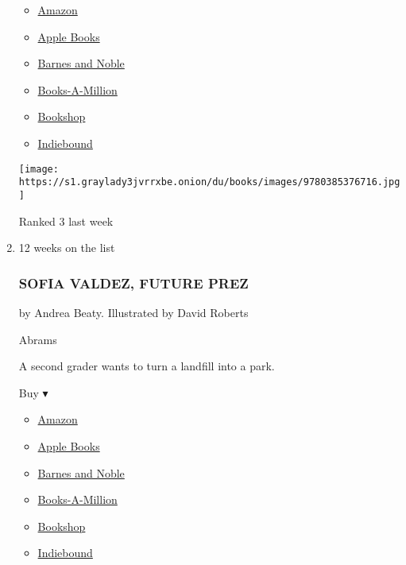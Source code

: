 \begin{enumerate}
  \begin{itemize}
  \tightlist
  \item
    \href{http://www.amazon.com/The-Wonderful-Things-You-Will/dp/0385376715?tag=NYTBS-20}{Amazon}
  \item
    \href{https://du-gae-books-dot-nyt-du-prd.appspot.com/buy?title=THE+WONDERFUL+THINGS+YOU+WILL+BE\&author=Emily+Winfield+Martin}{Apple
    Books}
  \item
    \href{https://www.anrdoezrs.net/click-7990613-11819508?url=https\%3A\%2F\%2Fwww.barnesandnoble.com\%2Fw\%2F\%3Fean\%3D9780385376716}{Barnes
    and Noble}
  \item
    \href{https://www.anrdoezrs.net/click-7990613-35140?url=https\%3A\%2F\%2Fwww.booksamillion.com\%2Fp\%2FTHE\%2BWONDERFUL\%2BTHINGS\%2BYOU\%2BWILL\%2BBE\%2FEmily\%2BWinfield\%2BMartin\%2F9780385376716}{Books-A-Million}
  \item
    \href{https://bookshop.org/a/3546/9780385376716}{Bookshop}
  \item
    \href{https://www.indiebound.org/book/9780385376716?aff=NYT}{Indiebound}
  \end{itemize}

  \texttt{[image: https://s1.graylady3jvrrxbe.onion/du/books/images/9780385376716.jpg]}

  Ranked 3 last week
\item
  12 weeks on the list

  \hypertarget{sofia-valdez-future-prez}{%
  \subsubsection{SOFIA VALDEZ, FUTURE
  PREZ}\label{sofia-valdez-future-prez}}

  by Andrea Beaty. Illustrated by David Roberts

  Abrams

  A second grader wants to turn a landfill into a park.

  Buy ▾

  \begin{itemize}
  \tightlist
  \item
    \href{https://www.amazon.com/Sofia-Valdez-Future-Prez-Questioneers/dp/141973704X?tag=NYTBS-20}{Amazon}
  \item
    \href{https://du-gae-books-dot-nyt-du-prd.appspot.com/buy?title=SOFIA+VALDEZ\%2C+FUTURE+PREZ\&author=Andrea+Beaty}{Apple
    Books}
  \item
    \href{https://www.anrdoezrs.net/click-7990613-11819508?url=https\%3A\%2F\%2Fwww.barnesandnoble.com\%2Fw\%2F\%3Fean\%3D9781419737046}{Barnes
    and Noble}
  \item
    \href{https://www.anrdoezrs.net/click-7990613-35140?url=https\%3A\%2F\%2Fwww.booksamillion.com\%2Fp\%2FSOFIA\%2BVALDEZ\%252C\%2BFUTURE\%2BPREZ\%2FAndrea\%2BBeaty\%2F9781419737046}{Books-A-Million}
  \item
    \href{https://bookshop.org/a/3546/9781419737046}{Bookshop}
  \item
    \href{https://www.indiebound.org/book/9781419737046?aff=NYT}{Indiebound}
  \end{itemize}


\end{enumerate}
